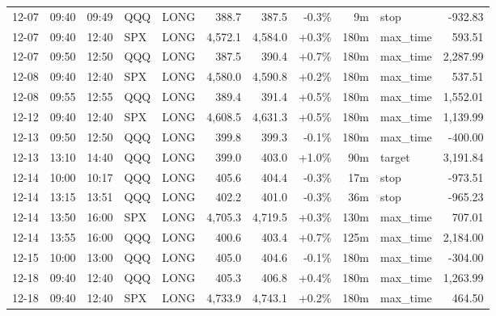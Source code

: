 \documentclass[11pt,a4paper,twoside]{article}
\begin{document}
\begin{center}
\begin{longtable}{>{\color{txtmain}}l l l l l r r r r >{\color{txtmain}}l r}
12-07 & 09:40 & 09:49 & QQQ & LONG & 388.7 & 387.5 & \textcolor{lossred}{-0.3\%} & 9m & stop & \textcolor{lossred}{-932.83} \\
12-07 & 09:40 & 12:40 & SPX & LONG & 4,572.1 & 4,584.0 & \textcolor{wingreen}{+0.3\%} & 180m & max\_time & \textcolor{wingreen}{593.51} \\
12-07 & 09:50 & 12:50 & QQQ & LONG & 387.5 & 390.4 & \textcolor{wingreen}{+0.7\%} & 180m & max\_time & \textcolor{wingreen}{2,287.99} \\
12-08 & 09:40 & 12:40 & SPX & LONG & 4,580.0 & 4,590.8 & \textcolor{wingreen}{+0.2\%} & 180m & max\_time & \textcolor{wingreen}{537.51} \\
12-08 & 09:55 & 12:55 & QQQ & LONG & 389.4 & 391.4 & \textcolor{wingreen}{+0.5\%} & 180m & max\_time & \textcolor{wingreen}{1,552.01} \\
12-12 & 09:40 & 12:40 & SPX & LONG & 4,608.5 & 4,631.3 & \textcolor{wingreen}{+0.5\%} & 180m & max\_time & \textcolor{wingreen}{1,139.99} \\
12-13 & 09:50 & 12:50 & QQQ & LONG & 399.8 & 399.3 & \textcolor{lossred}{-0.1\%} & 180m & max\_time & \textcolor{lossred}{-400.00} \\
12-13 & 13:10 & 14:40 & QQQ & LONG & 399.0 & 403.0 & \textcolor{wingreen}{+1.0\%} & 90m & target & \textcolor{wingreen}{3,191.84} \\
12-14 & 10:00 & 10:17 & QQQ & LONG & 405.6 & 404.4 & \textcolor{lossred}{-0.3\%} & 17m & stop & \textcolor{lossred}{-973.51} \\
12-14 & 13:15 & 13:51 & QQQ & LONG & 402.2 & 401.0 & \textcolor{lossred}{-0.3\%} & 36m & stop & \textcolor{lossred}{-965.23} \\
12-14 & 13:50 & 16:00 & SPX & LONG & 4,705.3 & 4,719.5 & \textcolor{wingreen}{+0.3\%} & 130m & max\_time & \textcolor{wingreen}{707.01} \\
12-14 & 13:55 & 16:00 & QQQ & LONG & 400.6 & 403.4 & \textcolor{wingreen}{+0.7\%} & 125m & max\_time & \textcolor{wingreen}{2,184.00} \\
12-15 & 10:00 & 13:00 & QQQ & LONG & 405.0 & 404.6 & \textcolor{lossred}{-0.1\%} & 180m & max\_time & \textcolor{lossred}{-304.00} \\
12-18 & 09:40 & 12:40 & QQQ & LONG & 405.3 & 406.8 & \textcolor{wingreen}{+0.4\%} & 180m & max\_time & \textcolor{wingreen}{1,263.99} \\
12-18 & 09:40 & 12:40 & SPX & LONG & 4,733.9 & 4,743.1 & \textcolor{wingreen}{+0.2\%} & 180m & max\_time & \textcolor{wingreen}{464.50} \\

\end{longtable}
\end{center}
\end{document}
